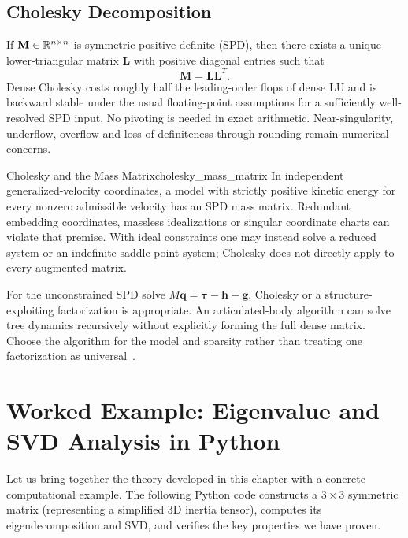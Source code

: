 \subsection{Cholesky Decomposition}
\label{subsec:cholesky_decomposition}

If $\mathbf{M}\in\mathbb{R}^{n\times n}$ is symmetric positive definite
(SPD), then there exists a unique lower-triangular matrix $\mathbf{L}$
with positive diagonal entries such that
\begin{equation}
  \label{eq:cholesky_decomposition}
  \mathbf{M} = \mathbf{L}\mathbf{L}^{T}.
\end{equation}
Dense Cholesky costs roughly half the leading-order flops of dense LU and is backward stable under the usual floating-point assumptions for a sufficiently well-resolved SPD input. No pivoting is needed in exact arithmetic. Near-singularity, underflow, overflow and loss of definiteness through rounding remain numerical concerns.

\begin{principle}{Cholesky and the Mass Matrix}{cholesky_mass_matrix}
In independent generalized-velocity coordinates, a model with strictly positive kinetic energy for every nonzero admissible velocity has an SPD mass matrix. Redundant embedding coordinates, massless idealizations or singular coordinate charts can violate that premise. With ideal constraints one may instead solve a reduced system or an indefinite saddle-point system; Cholesky does not directly apply to every augmented matrix.

For the unconstrained SPD solve $M\ddot{\mathbf q}=\boldsymbol\tau-\mathbf h-\mathbf g$, Cholesky or a structure-exploiting factorization is appropriate. An articulated-body algorithm can solve tree dynamics recursively without explicitly forming the full dense matrix. Choose the algorithm for the model and sparsity rather than treating one factorization as universal~\cite{nocedal2006}.

\end{principle}

\section{Worked Example: Eigenvalue and SVD Analysis in Python}
\label{sec:ch1_python_example}

Let us bring together the theory developed in this chapter with a concrete computational example. The following Python code constructs a $3 \times 3$ symmetric matrix (representing a simplified 3D inertia tensor), computes its eigendecomposition and SVD, and verifies the key properties we have proven.

